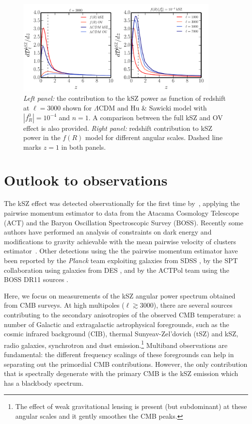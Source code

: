 \begin{figure}[!th]
\begin{center}
\includegraphics[width=0.9\textwidth]{Chapter6/Images/dDl_ksz}
\caption{\emph{Left panel:} the contribution to the kSZ power as function of redshift at $\ell = 3000$ shown for $\Lambda$CDM and Hu \& Sawicki model with $|f^0_R|=10^{-4}$ and $n=1$. A comparison between the full kSZ and OV effect is also provided. \emph{Right panel:} redshift contribution to kSZ power in the $f(R)$ model for different angular scales. Dashed line marks $z=1$ in both panels.}
\label{Fig:dDl_ksz}
\end{center}
\end{figure}


\section{Outlook to observations}\label{Sec:kSZ_obs}
The kSZ effect was detected observationally for the first time by~\cite{Hand2012}, applying the pairwise momentum estimator to data from the Atacama Cosmology Telescope (ACT) and the Baryon Oscillation Spectroscopic Survey (BOSS). Recently some authors have performed  an analysis of  constraints on dark energy and modifications to gravity achievable with  the mean pairwise velocity of clusters estimator~\citep{Mueller2015}. Other detections using the the pairwise momentum estimator have been reported by the \textit{Planck} team exploiting galaxies from SDSS \citep{Ade2016a}, by the SPT collaboration using galaxies from DES \citep{Soergel2016}, and by the ACTPol team using the BOSS DR11 sources \citep{DeBernardis2016}. 

Here, we focus on measurements of the kSZ angular power spectrum obtained from CMB surveys. At high multipoles ($\ell \gtrsim 3000$), there are several sources contributing to the secondary anisotropies of the observed CMB temperature: a number of Galactic and extragalactic astrophysical foregrounds, such as the cosmic infrared background (CIB), thermal Sunyeav-Zel'dovich (tSZ) and kSZ, radio galaxies, synchrotron and dust emission.\footnote{The effect of weak gravitational lensing is present (but subdominant) at these angular scales and it gently smoothes the CMB peaks.} Multiband observations are fundamental: the different frequency scalings of these foregrounds can help in separating out the primordial CMB contributions. However, the only contribution that is spectrally degenerate with the primary CMB is the kSZ emission which has a blackbody spectrum. 

